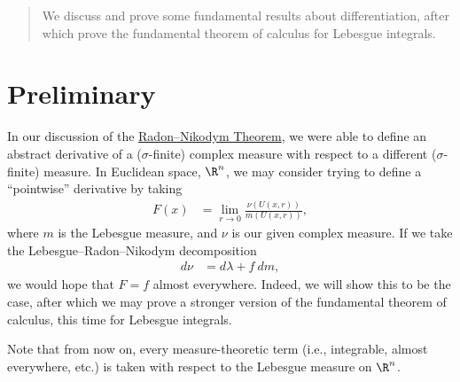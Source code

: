 \documentclass[10pt]{mypackage}
\begin{document}
\RaggedRight
\begin{abstract}
  \noindent We discuss and prove some fundamental results about differentiation, after which prove the fundamental theorem of calculus for Lebesgue integrals.
\end{abstract}
\section{Preliminary}%
In our discussion of the \href{https://ai-bearing.github.io/Classes_and_Homework/After\%20College/Expository\%20Writings/radon_nikodym.pdf}{Radon--Nikodym Theorem}, we were able to define an abstract derivative of a ($\sigma$-finite) complex measure with respect to a different ($\sigma$-finite) measure. In Euclidean space, $\R^n$, we may consider trying to define a ``pointwise'' derivative by taking
\begin{align*}
  F(x) &= \lim_{r\rightarrow 0} \frac{\nu\left( U\left( x,r \right) \right)}{m\left( U\left( x,r \right) \right)},
\end{align*}
where $m$ is the Lebesgue measure, and $\nu$ is our given complex measure. If we take the Lebesgue--Radon--Nikodym decomposition
\begin{align*}
  d\nu &= d\lambda + f\:dm,
\end{align*}
we would hope that $F = f$ almost everywhere. Indeed, we will show this to be the case, after which we may prove a stronger version of the fundamental theorem of calculus, this time for Lebesgue integrals.\newline

Note that from now on, every measure-theoretic term (i.e., integrable, almost everywhere, etc.) is taken with respect to the Lebesgue measure on $\R^n$.\newline
\end{document}
